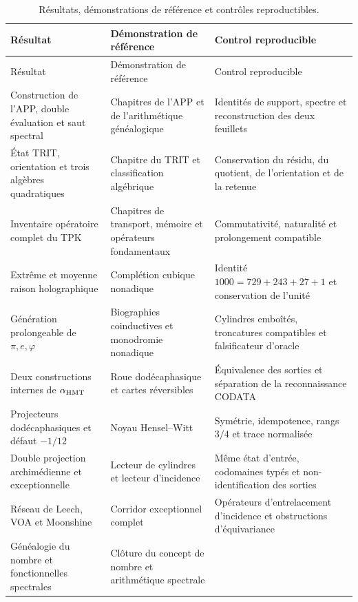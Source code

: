 \begingroup
\small
\setlength{\tabcolsep}{4pt}
\renewcommand{\arraystretch}{1.16}
\begin{longtable}{@{}>{\raggedright\arraybackslash}p{}
  >{\raggedright\arraybackslash}p{}
  >{\raggedright\arraybackslash}p{}@{}}
\caption{Résultats, démonstrations de référence et contrôles reproductibles.}
\label{tab:indice-fuentes-acumulativo}\\
\toprule
Résultat & Démonstration de référence & Control reproducible\\
\midrule
\endfirsthead
\toprule
Résultat & Démonstration de référence & Control reproducible\\
\midrule
\endhead
Construction de l'APP, double évaluation et saut spectral
& Chapitres de l'APP et de l'arithmétique généalogique
& Identités de support, spectre et reconstruction des deux feuillets\\
État TRIT, orientation et trois algèbres quadratiques
& Chapitre du TRIT et classification algébrique
& Conservation du résidu, du quotient, de l'orientation et de la retenue\\
Inventaire opératoire complet du TPK
& Chapitres de transport, mémoire et opérateurs fondamentaux
& Commutativité, naturalité et prolongement compatible\\
Extrême et moyenne raison holographique
& Complétion cubique nonadique
& Identité $1000=729+243+27+1$ et conservation de l'unité\\
Génération prolongeable de \(\pi,e,\varphi\)
& Biographies coinductives et monodromie nonadique
& Cylindres emboîtés, troncatures compatibles et falsificateur d'oracle\\
Deux constructions internes de \(\alpha_{\rm HMT}\)
& Roue dodécaphasique et cartes réversibles
& Équivalence des sorties et séparation de la reconnaissance CODATA\\
Projecteurs dodécaphasiques et défaut \(-1/12\)
& Noyau Hensel--Witt
& Symétrie, idempotence, rangs $3/4$ et trace normalisée\\
Double projection archimédienne et exceptionnelle
& Lecteur de cylindres et lecteur d'incidence
& Même état d'entrée, codomaines typés et non-identification des sorties\\
Réseau de Leech, VOA et Moonshine
& Corridor exceptionnel complet
& Opérateurs d'entrelacement d'incidence et obstructions d'équivariance\\
Généalogie du nombre et fonctionnelles spectrales
& Clôture du concept de nombre et arithmétique spectrale

\end{longtable}
